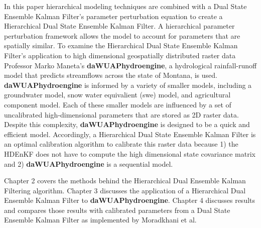 	In this paper hierarchical modeling techniques are combined with a Dual State Ensemble Kalman Filter's parameter perturbation equation to create a Hierarchical Dual State Ensemble Kalman Filter. A hierarchical parameter perturbation framework allows the model to account for parameters that are spatially similar. To examine the Hierarchical Dual State Ensemble Kalman Filter's application to high dimensional geospatially distributed raster data Professor Marko Maneta's \textbf{daWUAPhydroengine}, a hydrological rainfall-runoff model that predicts streamflows across the state of Montana, is used. \textbf{daWUAPhydroengine} is informed by a variety of smaller models, including a groundwater model, snow water equivalient (swe) model, and agricultural component model. Each of these smaller models are influenced by a set of uncalibrated high-dimensional parameters that are stored as 2D raster data. Despite this complexity, \textbf{daWUAPhydroengine} is designed to be a quick and efficient model. Accordingly, a Hierarchical Dual State Ensemble Kalman Filter is an optimal calibration algorithm to calibrate this raster data because 1) the HDEnKF does not have to compute the high dimensional state covariance matrix and 2) \textbf{daWUAPhydroengine} is a sequential model.
	
	Chapter 2 covers the methods behind the Hierarchical Dual Ensemble Kalman Filtering algorithm. Chapter 3 discusses the application of a Hierarchical Dual Ensemble Kalman Filter to \textbf{daWUAPhydroengine}. Chapter 4 discusses results and compares those results with calibrated parameters from a Dual State Ensemble Kalman Filter as implemented by Moradkhani et al.
	
	
	

	